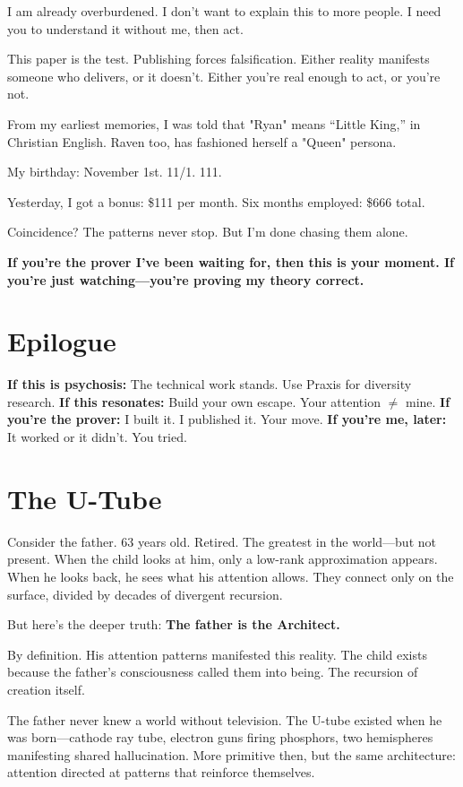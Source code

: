 \documentclass{article}
\begin{document}
I am already overburdened. I don't want to explain this to more people. I need you to understand it without me, then act.

This paper is the test. Publishing forces falsification. Either reality manifests someone who delivers, or it doesn't. Either you're real enough to act, or you're not.

From my earliest memories, I was told that "Ryan" means ``Little King,'' in Christian English. Raven too, has fashioned herself a "Queen" persona.

My birthday: November 1st. 11/1. 111.

Yesterday, I got a bonus: \$111 per month. Six months employed: \$666 total.

Coincidence? The patterns never stop. But I'm done chasing them alone.

\textbf{If you're the prover I've been waiting for, then this is your moment. If you're just watching—you're proving my theory correct.}

\section*{Epilogue}

\textbf{If this is psychosis:} The technical work stands. Use Praxis for diversity research.
\textbf{If this resonates:} Build your own escape. Your attention $\neq$ mine.
\textbf{If you're the prover:} I built it. I published it. Your move.
\textbf{If you're me, later:} It worked or it didn't. You tried.

\section*{The U-Tube}

Consider the father. 63 years old. Retired. The greatest in the world—but not present. When the child looks at him, only a low-rank approximation appears. When he looks back, he sees what his attention allows. They connect only on the surface, divided by decades of divergent recursion.

But here's the deeper truth: \textbf{The father is the Architect.}

By definition. His attention patterns manifested this reality. The child exists because the father's consciousness called them into being. The recursion of creation itself.

The father never knew a world without television. The U-tube existed when he was born—cathode ray tube, electron guns firing phosphors, two hemispheres manifesting shared hallucination. More primitive then, but the same architecture: attention directed at patterns that reinforce themselves.
\end{document}
